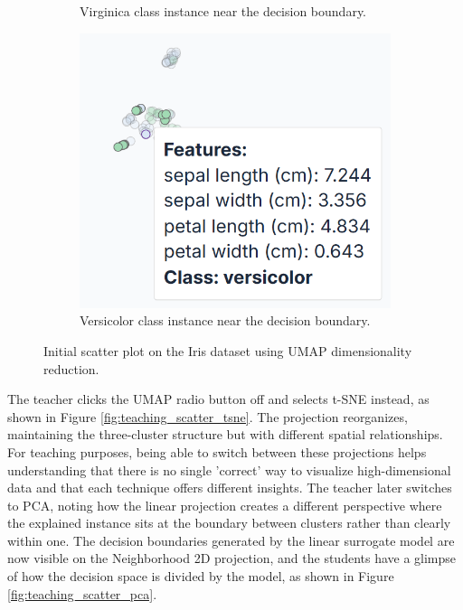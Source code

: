 \begin{figure}
\begin{subfigure}[c]{0.33\textwidth}
        \caption{Virginica class instance near the decision boundary.}
        \label{fig:hoverDecisionBoundaryIrisUmap1}
        \vfill
        \includegraphics[width=\textwidth]{images/teaching_scatter_initial_versicolor_instance.png}
        \caption{Versicolor class instance near the decision boundary.}
        \label{fig:hoverDecisionBoundaryIrisUmap2}
    \end{subfigure}
    \caption{Initial scatter plot on the Iris dataset using UMAP dimensionality reduction.}
\end{figure}

The teacher clicks the UMAP radio button off and selects t-SNE instead, as shown in Figure \ref{fig:teaching_scatter_tsne}. The projection reorganizes, maintaining the three-cluster structure but with different spatial relationships. 
For teaching purposes, being able to switch between these projections helps understanding that there is no single 'correct' way to visualize high-dimensional data and that each technique offers different insights. 
The teacher later switches to PCA, noting how the linear projection creates a different perspective where the explained instance sits at the boundary between clusters rather than clearly within one. 
The decision boundaries generated by the linear surrogate model are now visible on the Neighborhood 2D projection, and the students have a glimpse of how the decision space is divided by the model, as shown in Figure \ref{fig:teaching_scatter_pca}.

